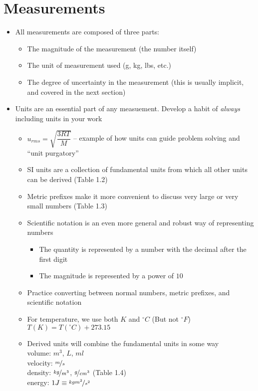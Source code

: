 \documentclass[12pt, openany, letterpaper]{memoir}
\begin{document}
\section{Measurements}
\begin{itemize}
  \item All measurements are composed of three parts:
  \begin{itemize}
    \item The magnitude of the measurement (the number itself)
    \item The unit of measurement used (g, kg, lbs, etc.)
    \item The degree of uncertainty in the measurement (this is usually implicit, and covered in the next section)
  \end{itemize}
  \item Units are an essential part of any measuement. Develop a habit of \emph{always} including units in your work
  \begin{itemize}
    \item $u_{rms}=\sqrt{\dfrac{3RT}{M}}$ -- example of how units can guide problem solving and ``unit purgatory''
    \item SI units are a collection of fundamental units from which all other units can be derived (Table 1.2)
    \item Metric prefixes make it more convenient to discuss very large or very small numbers (Table 1.3)
    \item Scientific notation is an even more general and robust way of representing numbers
    \begin{itemize}
      \item The quantity is represented by a number with the decimal after the first digit
      \item The magnitude is represented by a power of $10$
    \end{itemize}
    \item Practice converting between normal numbers, metric prefixes, and scientific notation
    \item For temperature, we use both $K$ and $^\circ C$ (But not $^\circ F$)
      \\$T(K) = T(^\circ C) + 273.15$ 
    \item Derived units will combine the fundamental units in some way 
      \\volume: $m^3$, $L$, $ml$
      \\velocity: $\nicefrac{m}{s}$ 
      \\density: $\nicefrac{kg}{m^3}$, $\nicefrac{g}{cm^3}$ (Table 1.4)
      \\energy: $1J\equiv \nicefrac{kgm^2}{s^2}$
  \end{itemize} 
\end{itemize}
\end{document}
